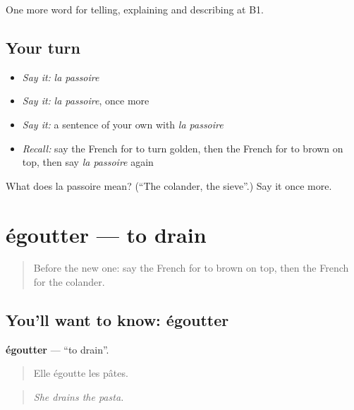 \begin{grammarlens}[title={What you've built}]
One more word for telling, explaining and describing at B1.
\end{grammarlens}

\subsection*{Your turn}
\begin{itemize}
\raggedright
  \item \emph{Say it:} \emph{la passoire}
  \item \emph{Say it:} \emph{la passoire}, once more
  \item \emph{Say it:} a sentence of your own with \emph{la passoire}
  \item \emph{Recall:} say the French for to turn golden, then the French for to brown on top, then say \emph{la passoire} again
\end{itemize}

\begin{tcolorbox}[breakable,colback=teal!4,colframe=teal!35!black,title={Before you move on}]
What does la passoire mean? (\textquotedblleft{}The colander, the sieve\textquotedblright{}.) Say it once more.
\end{tcolorbox}
\section[égoutter]{égoutter — to drain}

\label{lesson:FR-C332-egoutter}



\begin{quote}
Before the new one: say the French for to brown on top, then the French for the colander.
\end{quote}

\subsection*{You'll want to know: égoutter}
\textbf{égoutter} — \textquotedblleft{}to drain\textquotedblright{}.

\begin{quote}
Elle égoutte les pâtes.
\end{quote}

\begin{quote}
\emph{She drains the pasta.}
\end{quote}

